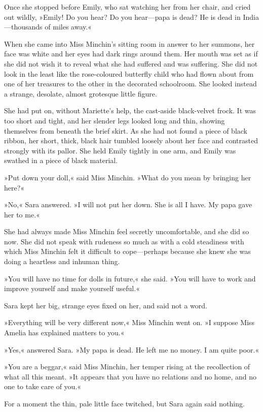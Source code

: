 Once she stopped before Emily, who sat watching her from her chair, and cried out wildly, »Emily! Do you hear? Do you hear—papa is dead? He is dead in India—thousands of miles away.«

When she came into Miss Minchin's sitting room in answer to her summons, her face was white and her eyes had dark rings around them. Her mouth was set as if she did not wish it to reveal what she had suffered and was suffering. She did not look in the least like the rose-coloured butterfly child who had flown about from one of her treasures to the other in the decorated schoolroom. She looked instead a strange, desolate, almost grotesque little figure.

She had put on, without Mariette's help, the cast-aside black-velvet frock. It was too short and tight, and her slender legs looked long and thin, showing themselves from beneath the brief skirt. As she had not found a piece of black ribbon, her short, thick, black hair tumbled loosely about her face and contrasted strongly with its pallor. She held Emily tightly in one arm, and Emily was swathed in a piece of black material.

»Put down your doll,« said Miss Minchin. »What do you mean by bringing her here?«

»No,« Sara answered. »I will not put her down. She is all I have. My papa gave her to me.«

She had always made Miss Minchin feel secretly uncomfortable, and she did so now. She did not speak with rudeness so much as with a cold steadiness with which Miss Minchin felt it difficult to cope—perhaps because she knew she was doing a heartless and inhuman thing.

»You will have no time for dolls in future,« she said. »You will have to work and improve yourself and make yourself useful.«

Sara kept her big, strange eyes fixed on her, and said not a word.

»Everything will be very different now,« Miss Minchin went on. »I suppose Miss Amelia has explained matters to you.«

»Yes,« answered Sara. »My papa is dead. He left me no money. I am quite poor.«

»You are a beggar,« said Miss Minchin, her temper rising at the recollection of what all this meant. »It appears that you have no relations and no home, and no one to take care of you.«

For a moment the thin, pale little face twitched, but Sara again said nothing.

